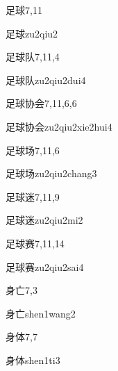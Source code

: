 \begin{entry}{足球}{7,11}
  \begin{phonetics}{足球}{zu2qiu2}
  \end{phonetics}
\end{entry}

\begin{entry}{足球队}{7,11,4}
  \begin{phonetics}{足球队}{zu2qiu2dui4}
  \end{phonetics}
\end{entry}

\begin{entry}{足球协会}{7,11,6,6}
  \begin{phonetics}{足球协会}{zu2qiu2xie2hui4}
  \end{phonetics}
\end{entry}

\begin{entry}{足球场}{7,11,6}
  \begin{phonetics}{足球场}{zu2qiu2chang3}
  \end{phonetics}
\end{entry}

\begin{entry}{足球迷}{7,11,9}
  \begin{phonetics}{足球迷}{zu2qiu2mi2}
  \end{phonetics}
\end{entry}

\begin{entry}{足球赛}{7,11,14}
  \begin{phonetics}{足球赛}{zu2qiu2sai4}
  \end{phonetics}
\end{entry}

\begin{entry}{身亡}{7,3}
  \begin{phonetics}{身亡}{shen1wang2}
  \end{phonetics}
\end{entry}

\begin{entry}{身体}{7,7}
  \begin{phonetics}{身体}{shen1ti3}
  \end{phonetics}
\end{entry}

